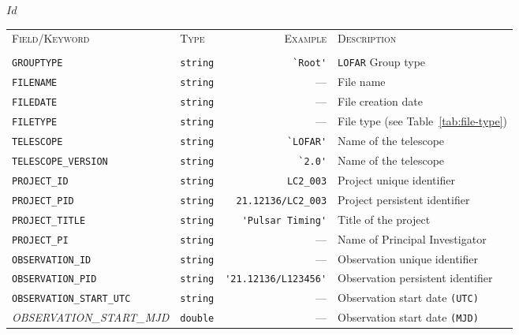 \svnInfo $Id$

\begin{table}[htbp]
  \centering
  \begin{tabular}{|lp{1.5cm}rp{5cm}|}


    \hline
    \textsc{Field/Keyword} & \textsc{Type} & \textsc{Example} & \textsc{Description} \\
     &  &   & \\
    \hline \hline


    \small \verb|GROUPTYPE| & \small\verb|string| & \verb|`Root'| &  \small{\verb|LOFAR|} Group type \\
    \small \verb|FILENAME| & \small\verb|string| & ---  &  File name \\
    \small \verb|FILEDATE| & \small\verb|string| & ---  &  File creation date \\
    \small \verb|FILETYPE| & \small\verb|string| & ---  &  File type (see Table~\ref{tab:file-type}) \\
    \small \verb|TELESCOPE| & \small\verb|string| & \verb|`LOFAR'|  &  Name of the telescope \\
    \small \verb|TELESCOPE_VERSION| & \small\verb|string| & \verb|`2.0'|  &  Name of the telescope \\
    \small \verb|PROJECT_ID| & \small\verb|string| & \verb|LC2_003|  &  Project unique identifier \\
    \small \verb|PROJECT_PID| & \small\verb|string| & \verb|21.12136/LC2_003|  &  Project persistent identifier \\
    \small \verb|PROJECT_TITLE| & \small\verb|string| & \verb|'Pulsar Timing'|  &  Title of the project \\
    \small \verb|PROJECT_PI| & \small\verb|string| & ---  &  Name of Principal Investigator  \\
    \small \verb|OBSERVATION_ID| & \small\verb|string| & ---  &  Observation unique identifier \\
    \small \verb|OBSERVATION_PID| & \small\verb|string| & \verb|'21.12136/L123456'|  &  Observation persistent identifier \\
    \small \verb|OBSERVATION_START_UTC| & \small\verb|string|& ---  &  Observation start date \verb|(UTC)| \\
    \small{\textit{OBSERVATION\_START\_MJD}} & \small\verb|double| & ---  &  Observation start date \verb|(MJD)|\\

\end{tabular}
\end{table}
